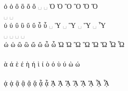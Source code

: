 \documentclass[a4paper]{article}
\begin{document}
{  ὀ   ὁ   ὂ   ὃ   ὄ   ὅ   ␣    ␣    Ὀ   Ὁ   Ὂ   Ὃ   Ὄ   Ὅ  \\
  \accpsili\textomicron{}
  \accdasia\textomicron{}
  \accpsilivaria\textomicron{}
  \accdasiavaria\textomicron{}
  \accpsilioxia\textomicron{}
  \accdasiaoxia\textomicron{}
  ␣ ␣ \accpsili\textOmicron{}
  \accdasia\textOmicron{}
  \accpsilivaria\textOmicron{}
  \accdasiavaria\textOmicron{}
  \accpsilioxia\textOmicron{}
  \accdasiaoxia\textOmicron{} \\

  ὐ   ὑ   ὒ   ὓ   ὔ   ὕ   ὖ    ὗ    ␣   Ὑ   ␣   Ὓ   ␣   Ὕ   ␣  Ὗ \\
  \accpsili\textupsilon{}
  \accdasia\textupsilon{}
  \accpsilivaria\textupsilon{}
  \accdasiavaria\textupsilon{}
  \accpsilioxia\textupsilon{}
  \accdasiaoxia\textupsilon{}
  \accpsiliperispomeni\textupsilon{}
  \accdasiaperispomeni\textupsilon{}
  ␣ \accdasia\textUpsilon{}
  ␣ \accdasiavaria\textUpsilon{}
  ␣ \accdasiaoxia\textUpsilon{}
  ␣ \accdasiaperispomeni\textUpsilon{} \\

  ὠ   ὡ   ὢ   ὣ   ὤ   ὥ   ὦ    ὧ    Ὠ   Ὡ   Ὢ   Ὣ   Ὤ   Ὥ   Ὦ  Ὧ \\
  \accpsili\textomega{}
  \accdasia\textomega{}
  \accpsilivaria\textomega{}
  \accdasiavaria\textomega{}
  \accpsilioxia\textomega{}
  \accdasiaoxia\textomega{}
  \accpsiliperispomeni\textomega{}
  \accdasiaperispomeni\textomega{}
  \accpsili\textOmega{}
  \accdasia\textOmega{}
  \accpsilivaria\textOmega{}
  \accdasiavaria\textOmega{}
  \accpsilioxia\textOmega{}
  \accdasiaoxia\textOmega{}
  \accpsiliperispomeni\textOmega{}
  \accdasiaperispomeni\textOmega{} \\

  ὰ   ά   ὲ   έ   ὴ   ή   ὶ    ί    ὸ   ό   ὺ   ύ   ὼ   ώ \\
  \accvaria\textalpha{}
  \accoxia\textalpha{}
  \accvaria\textepsilon{}
  \accoxia\textepsilon{}
  \accvaria\texteta{}
  \accoxia\texteta{}
  \accvaria\textiota{}
  \accoxia\textiota{}
  \accvaria\textomicron{}
  \accoxia\textomicron{}
  \accvaria\textupsilon{}
  \accoxia\textupsilon{}
  \accvaria\textomega{}
  \accoxia\textomega{} \\

  ᾀ   ᾁ   ᾂ   ᾃ   ᾄ   ᾅ   ᾆ    ᾇ    ᾈ   ᾉ   ᾊ   ᾋ   ᾌ   ᾍ   ᾎ  ᾏ \\
  \accpsili\textalpha\ypogegrammeni{}
  \accdasia\textalpha\ypogegrammeni{}
  \accpsilivaria\textalpha\ypogegrammeni{}
  \accdasiavaria\textalpha\ypogegrammeni{}
  \accpsilioxia\textalpha\ypogegrammeni{}
  \accdasiaoxia\textalpha\ypogegrammeni{}
  \accpsiliperispomeni\textalpha\ypogegrammeni{}
  \accdasiaperispomeni\textalpha\ypogegrammeni{}
  \accpsili\textAlpha\ypogegrammeni{}
  \accdasia\textAlpha\ypogegrammeni{}
  \accpsilivaria\textAlpha\ypogegrammeni{}
  \accdasiavaria\textAlpha\ypogegrammeni{}
  \accpsilioxia\textAlpha\ypogegrammeni{}
  \accdasiaoxia\textAlpha\ypogegrammeni{}
  \accpsiliperispomeni\textAlpha\ypogegrammeni{}
  \accdasiaperispomeni\textAlpha\ypogegrammeni{} \\

}
\end{document}
